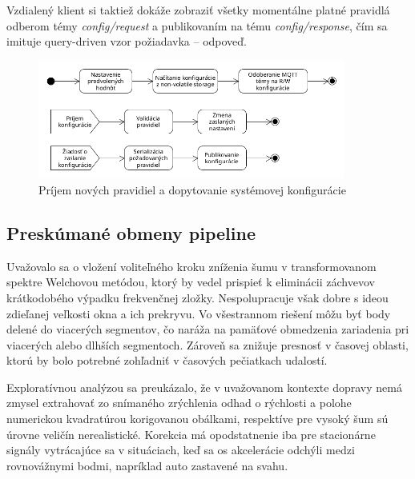 Vzdialený klient si taktiež dokáže
zobraziť všetky momentálne platné pravidlá odberom témy \emph{config/request} a publikovaním na tému \emph{config/response}, čím
sa imituje query-driven vzor požiadavka -- odpoveď.

\begin{figure}[h]
	\centering
	\includegraphics[width=0.9\textwidth]{figures/design/configuration.png}
	\caption{Príjem nových pravidiel a dopytovanie systémovej konfigurácie}
	\label{config-change}
\end{figure}

\subsection{Preskúmané obmeny pipeline}
Uvažovalo sa o vložení voliteľného kroku zníženia šumu v transformovanom spektre Welchovou metódou, ktorý by vedel prispieť
k eliminácii záchvevov krátkodobého výpadku frekvenčnej zložky. Nespolupracuje však dobre s ideou zdieľanej veľkosti okna a
ich prekryvu. Vo všestrannom riešení môžu byť body delené do viacerých segmentov, čo naráža na pamäťové obmedzenia zariadenia
pri viacerých alebo dlhších segmentoch. Zároveň sa znižuje presnosť v časovej oblasti, ktorú by bolo potrebné zohľadniť v časových
pečiatkach udalostí.

Exploratívnou analýzou sa preukázalo, že v uvažovanom kontexte dopravy nemá zmysel extrahovať zo snímaného zrýchlenia odhad
o rýchlosti a polohe numerickou kvadratúrou korigovanou obálkami, respektíve pre vysoký šum sú úrovne veličín nerealistické.
Korekcia má opodstatnenie iba pre stacionárne signály vytrácajúce sa v situáciach, keď sa os akcelerácie odchýli medzi
rovnovážnymi bodmi, napríklad auto zastavené na svahu.


